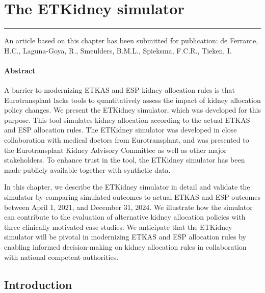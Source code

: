 \documentclass[11pt,twoside,]{book}
\begin{document}
\chapter{The ETKidney simulator}\label{CHetkidneysimulator}


\vfill

\begin{center}\rule{0.5\linewidth}{0.5pt}\end{center}

\noindent
An article based on this chapter has been submitted for publication:
de Ferrante, H.C., Laguna-Goya, R., Smeulders, B.M.L., Spieksma, F.C.R., Tieken, I.

\newpage
\normalsize

\subsubsection*{Abstract}

A barrier to modernizing ETKAS and ESP kidney allocation
rules is that Eurotransplant lacks tools to quantitatively assess the
impact of kidney allocation policy changes. We present the ETKidney simulator,
which was developed for this purpose. This tool simulates kidney allocation
according to the actual ETKAS and ESP allocation rules. The ETKidney simulator was
developed in close collaboration with medical doctors from
Eurotransplant, and was presented to the Eurotransplant Kidney
Advisory Committee as well as other major
stakeholders. To enhance trust in the tool, the ETKidney simulator
has been made publicly available together with synthetic data.

In this chapter, we describe the ETKidney simulator in detail and validate
the simulator by comparing simulated outcomes to actual ETKAS and ESP
outcomes between April 1, 2021, and December 31, 2024. We illustrate
how the simulator can contribute to the evaluation of alternative kidney allocation
policies with three clinically motivated case studies. We anticipate
that the ETKidney simulator will be pivotal in modernizing ETKAS and
ESP allocation rules by enabling informed decision-making on kidney
allocation rules in collaboration with national competent authorities.

\newpage
\normalsize

\section{Introduction}\label{introduction-4}
\end{document}

